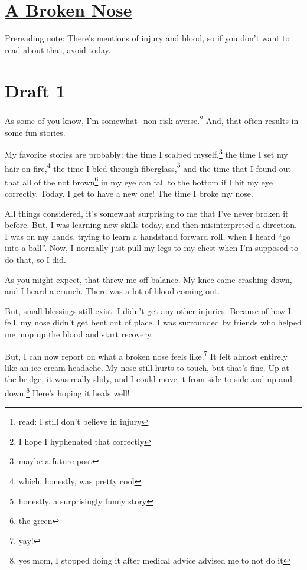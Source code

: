 \documentclass[12pt]{article}[titlepage]
\newcommand{\say}[1]{``#1''}
\newcommand{\1}{\={a}}
\newcommand{\2}{\={e}}
\newcommand{\3}{\={\i}}
\newcommand{\4}{\=o}
\newcommand{\5}{\=u}
\newcommand{\6}{\={A}}
\renewcommand{\,}{\textsuperscript{,}}
\begin{document}
\doublespacing
\section{\href{broken-nose.html}{A Broken Nose}}
Prereading note: There's mentions of injury and blood, so if you don't want to read about that, avoid today.
\section{Draft 1}
As some of you know, I'm somewhat\footnote{read: I still don't believe in injury} non-risk-averse.\footnote{I hope I hyphenated that correctly}
And, that often results in some fun stories.

My favorite stories are probably: the time I scalped myself,\footnote{maybe a future post} the time I set my hair on fire,\footnote{which, honestly, was pretty cool} the time I bled through fiberglass,\footnote{honestly, a surprisingly funny story} and the time that I found out that all of the not brown\footnote{the green} in my eye can fall to the bottom if I hit my eye correctly.
Today, I get to have a new one!
The time I broke my nose.

All things considered, it's somewhat surprising to me that I've never broken it before.
But, I was learning new skills today, and then misinterpreted a direction.
I was on my hands, trying to learn a handstand forward roll, when I heard \say{go into a ball}.
Now, I normally just pull my legs to my chest when I'm supposed to do that, so I did.

As you might expect, that threw me off balance.
My knee came crashing down, and I heard a crunch.
There was a lot of blood coming out.

But, small blessings still exist.
I didn't get any other injuries.
Because of how I fell, my nose didn't get bent out of place.
I was surrounded by friends who helped me mop up the blood and start recovery.

But, I can now report on what a broken nose feels like.\footnote{yay!}
It felt almost entirely like an ice cream headache.
My nose still hurts to touch, but that's fine.
Up at the bridge, it was really slidy, and I could move it from side to side and up and down.\footnote{yes mom, I stopped doing it after medical advice advised me to not do it}
Here's hoping it heals well!
\end{document}
